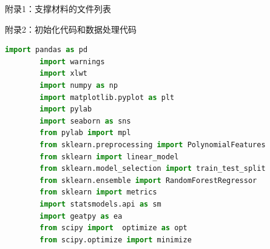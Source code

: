 \documentclass[a4paper]{article}
\begin{document}
	附录1：支撑材料的文件列表
	
	
	附录2：初始化代码和数据处理代码
	\begin{lstlisting}[language=python,columns=fullflexible,frame=shadowbox]
		import pandas as pd
		import warnings
		import xlwt
		import numpy as np
		import matplotlib.pyplot as plt
		import pylab
		import seaborn as sns
		from pylab import mpl
		from sklearn.preprocessing import PolynomialFeatures
		from sklearn import linear_model
		from sklearn.model_selection import train_test_split
		from sklearn.ensemble import RandomForestRegressor
		from sklearn import metrics
		import statsmodels.api as sm
		import geatpy as ea
		from scipy import  optimize as opt
		from scipy.optimize import minimize
	\end{lstlisting}
	
\end{document}
